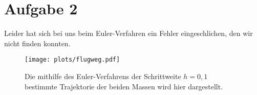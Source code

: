 \newpage
\section{Aufgabe 2}
\label{sec:auf2}

Leider hat sich bei uns beim Euler-Verfahren ein Fehler eingeschlichen, den wir nicht finden konnten.
\begin{figure}[H]
    \centering
    \texttt{[image: plots/flugweg.pdf]} \vspace*{-0.6cm}
    \caption{Die mithilfe des Euler-Verfahrens der Schrittweite $h=0,1$ bestimmte Trajektorie der beiden Massen wird hier dargestellt.}
    \label{fig:flugweg}
  \end{figure}
  \FloatBarrier
